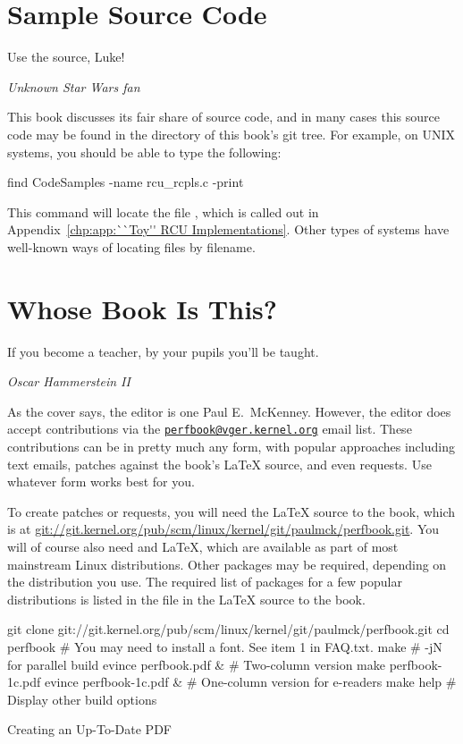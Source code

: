 \section{Sample Source Code}
\label{sec:howto:Sample Source Code}
%
\epigraph{Use the source, Luke!}{\emph{Unknown Star Wars fan}}

This book discusses its fair share of source code, and in many cases
this source code may be found in the  directory
of this book's git tree.
For example, on UNIX systems, you should be able to type the following:

\begin{VerbatimU}
find CodeSamples -name rcu_rcpls.c -print
\end{VerbatimU}

This command will locate the file , which is called out in
Appendix~\ref{chp:app:``Toy'' RCU Implementations}.
Other types of systems have well-known ways of locating files by filename.

\section{Whose Book Is This?}
\label{sec:howto:Whose Book Is This?}
%
\epigraph{If you become a teacher, by your pupils you'll be taught.}
	 {\emph{Oscar Hammerstein II}}

As the cover says, the editor is one Paul E.~McKenney.
However, the editor does accept contributions via the
\href{mailto:perfbook@vger.kernel.org}
{\nolinkurl{perfbook@vger.kernel.org}} email list.
These contributions can be in pretty much any form, with popular
approaches including text emails,
patches against the book's \LaTeX{} source, and even  requests.
Use whatever form works best for you.

To create patches or  requests, you will need the
\LaTeX{} source to the book, which is at
\url{git://git.kernel.org/pub/scm/linux/kernel/git/paulmck/perfbook.git}.
You will of course also need  and \LaTeX{}, which are
available as part of most mainstream Linux distributions.
Other packages may be required, depending on the distribution you use.
The required list of packages for a few popular distributions is listed
in the file  in the \LaTeX{} source to the book.

\begin{listing}[tbp]
\begin{VerbatimL}[breaklines=true,breakafter=/,
        breakaftersymbolpre=\raisebox{-.7ex}{\textcolor{darkgray}{\Pisymbol{psy}{191}}},
	breaksymbolleft=\textcolor{darkgray}{\tiny\ensuremath{\hookrightarrow}},
        numbers=none,xleftmargin=0pt]
git clone git://git.kernel.org/pub/scm/linux/kernel/git/paulmck/perfbook.git
cd perfbook
# You may need to install a font. See item 1 in FAQ.txt.
make                     # -jN for parallel build
evince perfbook.pdf &    # Two-column version
make perfbook-1c.pdf
evince perfbook-1c.pdf & # One-column version for e-readers
make help                # Display other build options
\end{VerbatimL}
\caption{Creating an Up-To-Date PDF}
\label{lst:howto:Creating a Up-To-Date PDF}
\end{listing}

